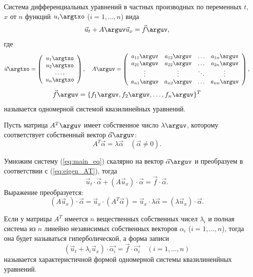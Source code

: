 \documentclass[14pt]{extarticle}
\begin{document}
\begin{dfn}
		Система  дифференциальных уравнений в частных производных по переменных $t$, $x$ от $n$ функций $u_i\argtxo$ ($i=1,\ldots,n$) вида
		\begin{equation}
			\label{eq:main_eq}
			\vec{u}_t +  A\arguv \vec{u}_x = \vec{f}\arguv,
		\end{equation}
		где
		\[
		\vec{u}\argtxo =  \left(
		\begin{array}{c}
			 u_1\argtxo \\
			 u_2\argtxo \\
			 \ldots, \\
			 u_n\argtxo 
		\end{array}
		\right),\quad
		A\arguv =  \left(
		\begin{array}{cccc}
			a_{11}\arguv & a_{12}\arguv  & \ldots & a_{1n}\arguv\\
			a_{21}\arguv & a_{22}\arguv  & \ldots & a_{2n}\arguv\\
			\vdots          & \vdots           & \ddots & \vdots \\
			a_{n1}\arguv & a_{n2}\arguv  & \ldots & a_{nn}\arguv\\
		\end{array}
		\right),
		\]
		\[
		\vec{f}\arguv = \{ f_1\arguv, f_2\arguv, \ldots, f_n\arguv \}^T
		\]
	называется одномерной системой квазилинейных уравнений.
\end{dfn}

Пусть матрица $A^T\arguv$ имеет собственное число $\lambda\arguv$, которому соответствует собственный вектор $\vec{\alpha}\arguv$:
\begin{equation}
	\label{eq:eigen_AT}
	A^T \vec{\alpha} = \lambda \vec{\alpha} \quad (\vec{\alpha} \neq 0).
\end{equation}

Умножим систему (\ref{eq:main_eq}) скалярно на вектор $\vec{\alpha}\arguv$ и преобразуем в соответствии с (\ref{eq:eigen_AT}), тогда
\[
\vec{u}_t\cdot\vec{\alpha} +  (A \vec{u}_x) \cdot\vec{\alpha} = \vec{f}\cdot\vec{\alpha}.
\]
Выражение преобразуется:
\[
(A \vec{u}_x) \cdot\vec{\alpha} = \vec{u}_x \cdot (A^T\vec{\alpha}) = \vec{u}_x \cdot\lambda \vec{\alpha} = (\lambda  \vec{u}_x) \cdot\vec{\alpha}.
\]

\begin{dfn}
\label{dfn:hyperbolic}
Если у матрицы $A^T$ имеется $n$ вещественных собственных чисел $\lambda_i$ и полная система из $n$ линейно независимых собственных векторов $\alpha_i$ ($i=1,\ldots,n$), тогда она  будет называться \alert{гиперболической}, а форма записи 
\begin{equation}
	\label{eq:main_character}
	(\vec{u}_t + \lambda_i \vec{u}_x)	\cdot \vec{\alpha_i} = \vec{f}\cdot\vec{\alpha_i}\quad (i=1,\ldots,n)
\end{equation}
называется характеристичной формой одномерной системы квазилиненйных уравнений.
\end{dfn}
\end{document}
